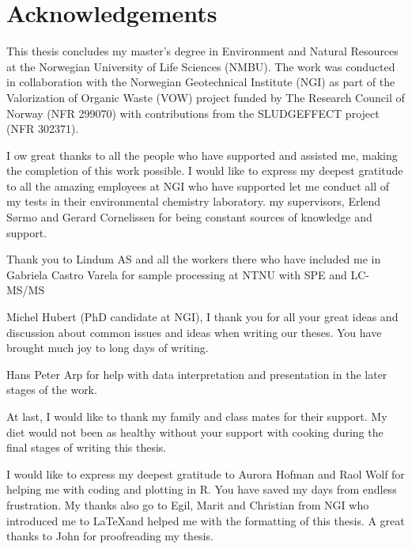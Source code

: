 \newpage
{}
\section*{Acknowledgements}
This thesis concludes my master's degree in Environment and Natural Resources at the Norwegian University of Life Sciences (NMBU). The work was conducted in collaboration with the Norwegian Geotechnical Institute (NGI) as part of the Valorization of Organic Waste (VOW) project funded by The Research Council of Norway (NFR 299070) with contributions from the SLUDGEFFECT project (NFR 302371). 

I ow great thanks to all the people who have supported and assisted me, making the completion of this work possible. I would like to express my deepest gratitude to all the amazing employees at NGI who have supported let me conduct all of my tests in their environmental chemistry laboratory.
my supervisors, Erlend Sørmo and Gerard Cornelissen for being constant sources of knowledge and support. 
  

Thank you to Lindum AS and all the workers there  who have included me in 
Gabriela Castro Varela for sample processing at NTNU with SPE and LC-MS/MS

Michel Hubert (PhD candidate at NGI), I thank you for all your great ideas and discussion about common issues and ideas when writing our theses. You have brought much joy to long days of writing. 

Hans Peter Arp for help with data interpretation and presentation in the later stages of the work. 

At last, I would like to thank my family and class mates for their support. My diet would not been as healthy without your support with cooking during the final stages of writing this thesis. 

I would like to express my deepest gratitude to Aurora Hofman and Raol Wolf for helping me with coding and plotting in R. You have saved my days from endless frustration. My thanks also go to Egil, Marit and Christian from NGI who introduced me to \LaTeX and helped me with the formatting of this thesis. A great thanks to John for proofreading my thesis. 
